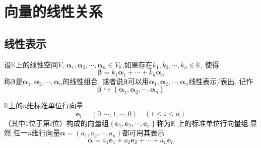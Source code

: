 \section{向量的线性关系}
\subsection{线性表示}
\begin{formal}
\begin{definition}[线性表示]\label{def:线性表示}
    设$\mathbb{K}$上的线性空间$V$,
    $\bm{\alpha}_1,\bm{\alpha}_2,\cdots,
    \bm{\alpha}_n \in 
    V_{\mathbb{K}}$,如果存在$
    k_1,k_2,\cdots,k_n \in \mathbb{K}$,
    使得
    \[
    \bm{\beta} = 
    k_1\bm{\alpha}_1+\cdots+
    k_n\bm{\alpha}_n
    \]
    称$\bm{\beta}$是$\bm{\alpha}_1,
    \bm{\alpha}_2,\cdots,\bm{\alpha}_n$的线性组合,
    或者说$\bm{\beta}$可以用$\bm{\alpha}_1
    ,\bm{\alpha}_2,\cdots,\bm{\alpha}_n$线性表示/表出.
    记作
    \[
    \bm{\beta}\hookrightarrow \left\{\bm{\alpha}_1,\bm{\alpha}_2,\cdots,\bm{\alpha}_n\right\}
    \]
\end{definition}
\end{formal}
\begin{brown}
\begin{example}
    $\mathbb{K}$上的$n$维标准单位行向量
    \[
    \bm{e}_i = \left(0,\cdots,1,\cdots,0\right)
    \quad
    \left(1\leqslant i\leqslant n\right)
    \]
    （其中$1$位于第$i$位）构成的向量组$\left\{\bm{e}_1,\bm{e}_2,\cdots
    ,\bm{e}_n\right\}$称为$\mathbb{K}$
    上的标准单位行向量组.显然
    任一$n$维行向量$\bm{\alpha}=
    \left(a_1,a_2,\cdots,a_n\right)$都可用其表示
    \[
    \bm{\alpha}=a_1\bm{e}_1+a_2\bm{e}_2+\cdots+a_n\bm{e}_n
    \]
\end{example}\end{brown}
